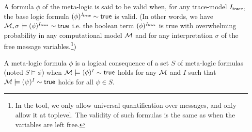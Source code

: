 \begin{definition}
  A formula $\phi$ of the meta-logic is said to be valid when,
  for any trace-model $I_{\textsf{trace}}$, the base logic formula
  $(\phi)^{I_{\textsf{trace}}} \sim \mathsf{true}$ is valid.
  (In other words, we have $\mathcal{M},\sigma\models(\phi)^{I_{\textsf{trace}}}\sim\mathsf{true}$
  i.e. the boolean term $(\phi)^{I_{\textsf{trace}}}$ is true with overwhelming
  probability in any computational model $\mathcal{M}$ and for any interpretation
  $\sigma$ of the free message variables.\footnote{
    In the tool, we only allow universal quantification over messages, and
  only allow it at toplevel. The validity of such formulas is the same as
  when the variables are left free.})
\end{definition}

\begin{definition}
  A meta-logic formula $\phi$ is a
  logical consequence of a set $S$ of meta-logic formulas
  (noted $S \models \phi$)
  when
  $\mathcal{M}\models(\phi)^I\sim\mathsf{true}$ holds for any $\mathcal{M}$ and $I$ such that
  $\mathcal{M}\models(\psi)^I\sim\mathsf{true}$ holds for all $\psi\in S$.
\end{definition}
